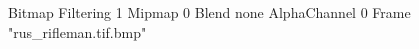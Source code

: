 {Bitmap
	{Filtering 1}
	{Mipmap 0}
	{Blend none}
	{AlphaChannel 0}
	{Frame "rus_rifleman.tif.bmp"}
}
